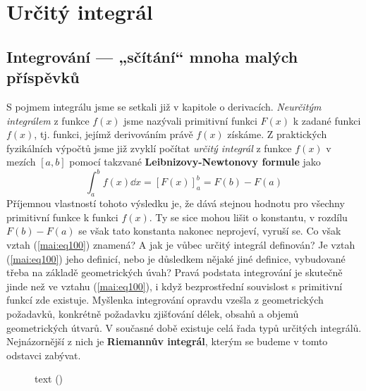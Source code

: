 \setchaptertoc
\chapter{Určitý integrál}
  \section{Integrování — „sčítání“ mnoha malých příspěvků} 
    S pojmem integrálu jsme se setkali již v kapitole o derivacích. \emph{Neurčitým integrálem} z
    funkce \(f(x)\) jsme nazývali primitivní funkci \(F(x)\) k zadané funkci \(f(x)\), tj. funkci,
    jejímž derivováním právě \(f(x)\) získáme. Z praktických fyzikálních výpočtů jsme již zvyklí
    počítat \emph{určitý integrál} z funkce \(f(x)\) v mezích \([a, b]\) pomocí takzvané
    \textbf{Leibnizovy-Newtonovy formule} jako 
    \begin{equation}\label{mai:eq100}
      \int_a^bf(x)\dd{x} = [F(x)]_a^b = F(b) - F(a)
    \end{equation}
    Příjemnou vlastností tohoto výsledku je, že dává stejnou hodnotu pro všechny primitivní funkce k
    funkci \(f(x)\). Ty se sice mohou lišit o konstantu, v rozdílu \(F(b) - F(a)\) se však tato
    konstanta nakonec neprojeví, vyruší se. Co však vztah (\ref{mai:eq100}) znamená? A jak je vůbec
    určitý integrál definován? Je vztah (\ref{mai:eq100}) jeho definicí, nebo je důsledkem nějaké
    jiné definice, vybudované třeba na základě geometrických úvah? Pravá podstata integrování je
    skutečně jinde než ve vztahu (\ref{mai:eq100}), i když bezprostřední souvislost s primitivní
    funkcí zde existuje. Myšlenka integrování opravdu vzešla z geometrických požadavků, konkrétně
    požadavku zjišťování délek, obsahů a objemů geometrických útvarů. V současné době existuje celá
    řada typů určitých inte­grálů. Nejnázornější z nich je \textbf{Riemannův integrál}, kterým se
    budeme v tomto odstavci zabývat.

    \begin{figure}[ht!]
      \centering
      \caption{text
              (\cite[s.~10000]{Feynman01})}
    \end{figure}


